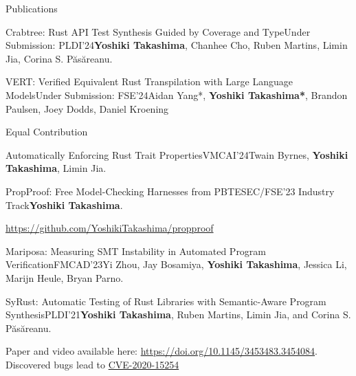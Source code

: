 \documentclass{resume} %
\begin{document}
\begin{rSection}{Publications}
  \begin{rPubsection}{Crabtree: Rust API Test Synthesis Guided by
      Coverage and Type}{Under Submission: PLDI'24}{\textbf{Yoshiki
        Takashima}, Chanhee Cho, Ruben Martins, Limin Jia, Corina
      S. P\u{a}s\u{a}reanu.}{}
  \end{rPubsection}

  \begin{rPubsection}{VERT: Verified Equivalent Rust Transpilation
      with Large Language Models}{Under Submission: FSE'24}{Aidan Yang*,
      \textbf{Yoshiki Takashima*}, Brandon Paulsen, Joey Dodds, Daniel
      Kroening}{}

    {\footnotesize *Equal Contribution}
  \end{rPubsection}

  \begin{rPubsection}{Automatically Enforcing Rust Trait
      Properties}{VMCAI'24}{Twain Byrnes, \textbf{Yoshiki Takashima}, Limin
      Jia.}{}
  \end{rPubsection}

  \begin{rPubsection}{PropProof: Free Model-Checking Harnesses from
      PBT}{ESEC/FSE’23 Industry Track}{\textbf{Yoshiki Takashima}.}{}

    {\footnotesize
      \href{https://github.com/YoshikiTakashima/propproof}
      {https://github.com/YoshikiTakashima/propproof}}
  \end{rPubsection}

  \begin{rPubsection}{Mariposa: Measuring SMT Instability in Automated
      Program Verification}{FMCAD'23}{Yi Zhou, Jay Bosamiya, \textbf{Yoshiki
      Takashima}, Jessica Li, Marijn Heule, Bryan Parno.}{}

  \end{rPubsection}

  \begin{rPubsection}{SyRust: Automatic Testing of Rust Libraries with
      Semantic-Aware Program Synthesis}{PLDI'21}{\textbf{Yoshiki Takashima},
      Ruben Martins, Limin Jia, and Corina S. P\u{a}s\u{a}reanu.}{}

    {\footnotesize Paper and video available here:
      \href{https://doi.org/10.1145/3453483.3454084}
      {https://doi.org/10.1145/3453483.3454084}. Discovered bugs lead
      to
      \href{https://nvd.nist.gov/vuln/detail/CVE-2020-15254}{CVE-2020-15254}}
  \end{rPubsection}


\end{rSection}
\end{document}
